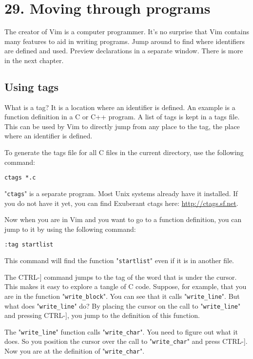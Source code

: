 \section{29. Moving through programs}
The creator of Vim is a computer programmer.
It's no surprise that Vim contains many features to aid in writing programs.
Jump around to find where identifiers are defined and used.
Preview declarations in a separate window.
There is more in the next chapter.
\subsection{Using tags}
\label{Using tags}
What is a tag?  It is a location where an identifier is defined.
An example is a function definition in a C or C++ program.
A list of tags is kept in a tags file.
This can be used by Vim to directly jump from any place to the tag, the place where an identifier is defined.

To generate the tags file for all C files in the current directory, use the following command:

\begin{Verbatim}[samepage=true]
 ctags *.c
\end{Verbatim}

"\verb!ctags!" is a separate program.
Most Unix systems already have it installed.
If you do not have it yet, you can find Exuberant ctags here: \url{http://ctags.sf.net}.

Now when you are in Vim and you want to go to a function definition, you can jump to it by using the following command:

\begin{Verbatim}[samepage=true]
 :tag startlist
\end{Verbatim}

This command will find the function "\verb!startlist!" even if it is in another file.

The CTRL-] command jumps to the tag of the word that is under the cursor.
This makes it easy to explore a tangle of C code.
Suppose, for example, that you are in the function "\verb!write_block!".
You can see that it calls "\verb!write_line!".
But what does "\verb!write_line!" do?  By placing the cursor on the call to "\verb!write_line!" and pressing CTRL-], you jump to the definition of this function.

The "\verb!write_line!" function calls "\verb!write_char!".
You need to figure out what it does.
So you position the cursor over the call to "\verb!write_char!" and press CTRL-].
Now you are at the definition of "\verb!write_char!".

